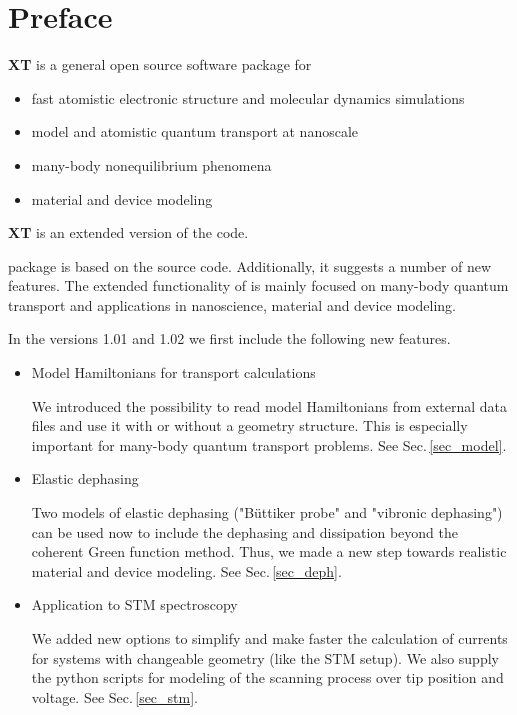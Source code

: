 {\new
\chapter*{Preface}

{\bf {\dftbp}XT} is a general open source software package for \\[-0.6cm]
\begin{itemize}
\item fast atomistic electronic structure and molecular dynamics simulations
\item model and atomistic quantum transport at nanoscale 
\item many-body nonequilibrium phenomena
\item material and device modeling
\end{itemize}  

{\bf {\dftbp}XT} is an extended version of the {\bf{\dftbp}} code.
 
{\dftbpxt} package \cite{OpenSuite} is based on the {\dftbp} \cite{dftbp-2020paper,Pecchia_NJP} source code. Additionally, it suggests a number of new features. The extended functionality of {\dftbpxt} is mainly focused on many-body quantum transport and applications in nanoscience, material and device modeling. 
 
\null
In the versions 1.01 and 1.02 we first include the following new features.

\begin{itemize}

\item Model Hamiltonians for transport calculations

We introduced the possibility to read model Hamiltonians from external data files and use it with or without a geometry structure. This is especially important for many-body quantum transport problems. See Sec.\,\ref{sec_model}.
  
\item Elastic dephasing

Two models of elastic dephasing ("B\"uttiker probe" and "vibronic dephasing") can be used now to include the dephasing and dissipation    beyond the coherent Green function method. Thus, we made a new step towards realistic material and device modeling. See Sec.\,\ref{sec_deph}. 
  
\item Application to STM spectroscopy

We added new options to simplify and make faster the calculation of currents for systems with changeable geometry (like the STM setup). We also supply the python scripts for modeling of the scanning process over tip position and voltage. See Sec.\,\ref{sec_stm}.

\end{itemize}

}